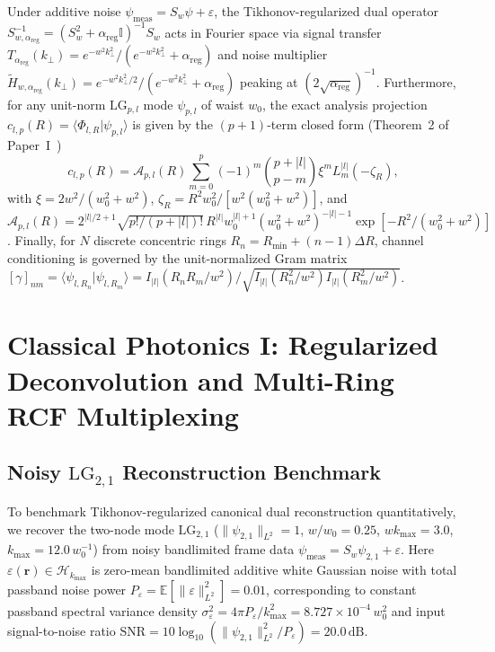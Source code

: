 \documentclass[aps,pra,onecolumn,notitlepage,11pt,tightenlines,nofootinbib,floatfix,longbibliography]{revtex4-2}
\newcommand{\braket}[2]{\langle #1 | #2 \rangle}
\newcommand{\norm}[1]{\lVert #1 \rVert}
\newcommand{\abs}[1]{\lvert #1 \rvert}
\begin{document}
Under additive noise $\psi_{\mathrm{meas}} = S_w\psi + \varepsilon$, the Tikhonov-regularized dual operator $S_{w,\alpha_{\mathrm{reg}}}^{-1} = (S_w^2 + \alpha_{\mathrm{reg}}\mathbb{I})^{-1}S_w$ acts in Fourier space via signal transfer $T_{\alpha_{\mathrm{reg}}}(k_\perp) = e^{-w^2 k_\perp^2}/(e^{-w^2 k_\perp^2}+\alpha_{\mathrm{reg}})$ and noise multiplier $\widetilde{H}_{w,\alpha_{\mathrm{reg}}}(k_\perp) = e^{-w^2 k_\perp^2/2}/(e^{-w^2 k_\perp^2}+\alpha_{\mathrm{reg}})$ peaking at $(2\sqrt{\alpha_{\mathrm{reg}}})^{-1}$. Furthermore, for any unit-norm $\mathrm{LG}_{p,l}$ mode $\psi_{p,l}$ of waist $w_0$, the exact analysis projection $c_{l,p}(R) = \braket{\Phi_{l,R}}{\psi_{p,l}}$ is given by the $(p+1)$-term closed form (Theorem~2 of Paper~I~\cite{AyalaPaperI})
\begin{equation}
c_{l,p}(R) = \mathcal{A}_{p,l}(R) \sum_{m=0}^p (-1)^m \binom{p+\abs{l}}{p-m} \xi^m L_m^{\abs{l}}(-\zeta_R),
\label{eq:c_lp_recap}
\end{equation}
with $\xi = 2w^2/(w_0^2+w^2)$, $\zeta_R = R^2 w_0^2/[w^2(w_0^2+w^2)]$, and $\mathcal{A}_{p,l}(R) = 2^{\abs{l}/2+1}\sqrt{p!/(p+\abs{l})!}\,\allowbreak R^{\abs{l}}w_0^{\abs{l}+1}(w_0^2+w^2)^{-\abs{l}-1}\allowbreak \exp[-R^2/(w_0^2+w^2)]$. Finally, for $N$ discrete concentric rings $R_n = R_{\min} + (n-1)\Delta R$, channel conditioning is governed by the unit-normalized Gram matrix $[\gamma]_{nm} = \braket{\psi_{l,R_n}}{\psi_{l,R_m}} = \allowbreak I_{\abs{l}}(R_n R_m/w^2)/\allowbreak \sqrt{I_{\abs{l}}(R_n^2/w^2)I_{\abs{l}}(R_m^2/w^2)}$.

\section{Classical Photonics I: Regularized Deconvolution and Multi-Ring RCF Multiplexing}
\label{sec:classical_sdm}

\subsection{Noisy \texorpdfstring{$\mathrm{LG}_{2,1}$}{LG\_\{2,1\}} Reconstruction Benchmark}
\label{subsec:noisy_lg21}

To benchmark Tikhonov-regularized canonical dual reconstruction quantitatively, we recover the two-node mode $\mathrm{LG}_{2,1}$ ($\norm{\psi_{2,1}}_{L^2} = 1$, $w/w_0 = 0.25$, $w k_{\max} = 3.0$, $k_{\max} = 12.0\,w_0^{-1}$) from noisy bandlimited frame data $\psi_{\mathrm{meas}} = S_w\psi_{2,1} + \varepsilon$. Here $\varepsilon(\mathbf{r}) \in \mathcal{H}_{k_{\max}}$ is zero-mean bandlimited additive white Gaussian noise with total passband noise power $P_\varepsilon = \mathbb{E}[\norm{\varepsilon}_{L^2}^2] = 0.01$, corresponding to constant passband spectral variance density $\sigma_\varepsilon^2 = 4\pi P_\varepsilon/k_{\max}^2 = 8.727\times 10^{-4}\,w_0^2$ and input signal-to-noise ratio $\mathrm{SNR} = 10\log_{10}(\norm{\psi_{2,1}}_{L^2}^2/P_\varepsilon) = 20.0\,\mathrm{dB}$.
\end{document}
